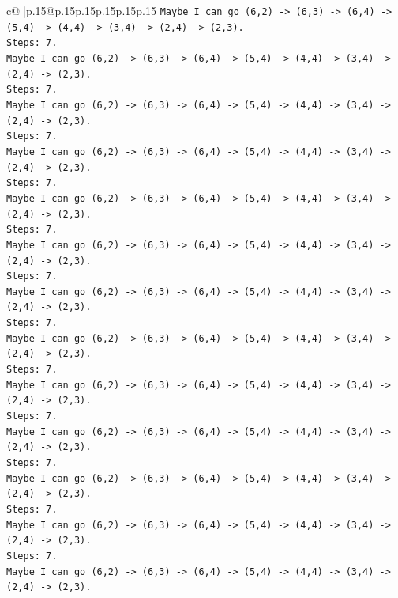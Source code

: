 \documentclass{article}
\begin{document}
{\begin{supertabular}{c@{$\;$}|p{.15\linewidth}@{}p{.15\linewidth}p{.15\linewidth}p{.15\linewidth}p{.15\linewidth}p{.15\linewidth}}
{{{\texttt{Maybe I can go (6,2) {-}> (6,3) {-}> (6,4) {-}> (5,4) {-}> (4,4) {-}> (3,4) {-}> (2,4) {-}> (2,3).} \\
\texttt{Steps: 7.} \\
\texttt{Maybe I can go (6,2) {-}> (6,3) {-}> (6,4) {-}> (5,4) {-}> (4,4) {-}> (3,4) {-}> (2,4) {-}> (2,3).} \\
\texttt{Steps: 7.} \\
\texttt{Maybe I can go (6,2) {-}> (6,3) {-}> (6,4) {-}> (5,4) {-}> (4,4) {-}> (3,4) {-}> (2,4) {-}> (2,3).} \\
\texttt{Steps: 7.} \\
\texttt{Maybe I can go (6,2) {-}> (6,3) {-}> (6,4) {-}> (5,4) {-}> (4,4) {-}> (3,4) {-}> (2,4) {-}> (2,3).} \\
\texttt{Steps: 7.} \\
\texttt{Maybe I can go (6,2) {-}> (6,3) {-}> (6,4) {-}> (5,4) {-}> (4,4) {-}> (3,4) {-}> (2,4) {-}> (2,3).} \\
\texttt{Steps: 7.} \\
\texttt{Maybe I can go (6,2) {-}> (6,3) {-}> (6,4) {-}> (5,4) {-}> (4,4) {-}> (3,4) {-}> (2,4) {-}> (2,3).} \\
\texttt{Steps: 7.} \\
\texttt{Maybe I can go (6,2) {-}> (6,3) {-}> (6,4) {-}> (5,4) {-}> (4,4) {-}> (3,4) {-}> (2,4) {-}> (2,3).} \\
\texttt{Steps: 7.} \\
\texttt{Maybe I can go (6,2) {-}> (6,3) {-}> (6,4) {-}> (5,4) {-}> (4,4) {-}> (3,4) {-}> (2,4) {-}> (2,3).} \\
\texttt{Steps: 7.} \\
\texttt{Maybe I can go (6,2) {-}> (6,3) {-}> (6,4) {-}> (5,4) {-}> (4,4) {-}> (3,4) {-}> (2,4) {-}> (2,3).} \\
\texttt{Steps: 7.} \\
\texttt{Maybe I can go (6,2) {-}> (6,3) {-}> (6,4) {-}> (5,4) {-}> (4,4) {-}> (3,4) {-}> (2,4) {-}> (2,3).} \\
\texttt{Steps: 7.} \\
\texttt{Maybe I can go (6,2) {-}> (6,3) {-}> (6,4) {-}> (5,4) {-}> (4,4) {-}> (3,4) {-}> (2,4) {-}> (2,3).} \\
\texttt{Steps: 7.} \\
\texttt{Maybe I can go (6,2) {-}> (6,3) {-}> (6,4) {-}> (5,4) {-}> (4,4) {-}> (3,4) {-}> (2,4) {-}> (2,3).} \\
\texttt{Steps: 7.} \\
\texttt{Maybe I can go (6,2) {-}> (6,3) {-}> (6,4) {-}> (5,4) {-}> (4,4) {-}> (3,4) {-}> (2,4) {-}> (2,3).} \\
}}}
\end{supertabular}}
\end{document}
